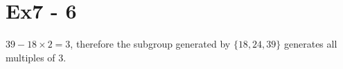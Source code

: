 \section*{Ex7 - 6}
$ 39 - 18 \times 2 = 3 $, therefore the subgroup generated by $ \{18, 24, 39\} $ generates all multiples of 3.